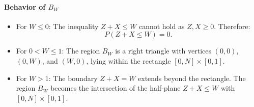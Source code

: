 \paragraph{Behavior of \( B_W \)}
\begin{itemize}
    \item  For \( W \leq 0 \): The inequality \( Z + X \leq W \) cannot hold as \( Z, X \geq 0 \). Therefore:
  \[
  P(Z + X \leq W) = 0.
  \]
    \item For \( 0 < W \leq 1 \): The region \( B_W \) is a right triangle with vertices \( (0, 0) \), \( (0, W) \), and \( (W, 0) \), lying within the rectangle \( [0, N] \times [0, 1] \).
    \item For \( W > 1 \): The boundary \( Z + X = W \) extends beyond the rectangle. The region \( B_W \) becomes the intersection of the half-plane \( Z + X \leq W \) with \( [0, N] \times [0, 1] \).
\end{itemize}

